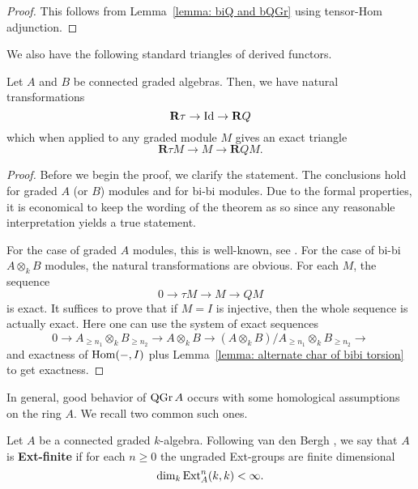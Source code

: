 \documentclass[dissertation.tex]{subfiles}
\begin{document}
\begin{proof}
  This follows from Lemma~\ref{lemma: biQ and bQGr} using tensor-Hom adjunction. 
\end{proof}

We also have the following standard triangles of derived functors. 

\begin{lemma} \label{lemma: exact triangles}
  Let \(A\) and \(B\) be connected graded algebras. Then, we have natural transformations 
  \begin{displaymath}
    \mathbf{R} \tau \to \operatorname{Id} \to \mathbf{R} Q 
  \end{displaymath}
  which when applied to any graded module \(M\) gives an exact triangle 
  \begin{displaymath}
    \mathbf{R} \tau M \to M \to \mathbf{R} Q M.
  \end{displaymath}
\end{lemma}

\begin{proof}
  Before we begin the proof, we clarify the statement. The conclusions hold for graded \(A\) (or \(B\)) modules and for bi-bi modules. Due to the formal properties, it is economical to keep the wording of the theorem as so since any reasonable interpretation yields a true statement. 
  
  For the case of graded \(A\) modules, this is well-known, see \cite[Property 4.6]{BV}. For the case of bi-bi \(A \otimes_k B\) modules, the natural transformations are obvious. For each \(M\), the sequence 
  \begin{displaymath}
    0 \to \tau M \to M \to Q M
  \end{displaymath}
  is exact. It suffices to prove that if \(M = I\) is injective, then the whole sequence is actually exact. Here one can use the system of exact sequences
  \begin{displaymath}
    0 \to A_{\geq n_1} \otimes_k B_{\geq n_2} \to A \otimes_k B \to (A \otimes_k B) / A_{\geq n_1} \otimes_k B_{\geq n_2} \to 
  \end{displaymath}
  and exactness of \(\operatorname{Hom}(-,I)\) plus Lemma~\ref{lemma: alternate char of bibi torsion} to get exactness. 
\end{proof}


In general, good behavior of \(\operatorname{QGr}A\) occurs with some homological assumptions on the ring \(A\). We recall two common such ones. 

\begin{definition} \label{definition: Ext-finite}
  Let \(A\) be a connected graded \(k\)-algebra. Following van den Bergh \cite{VdB}, we say that \(A\) is \textbf{Ext-finite} if for each \(n \geq 0\) the ungraded Ext-groups are finite dimensional 
  \begin{displaymath}
    \operatorname{dim}_k \operatorname{Ext}_A^n (k,k) < \infty.
  \end{displaymath}
\end{definition}
\end{document}
